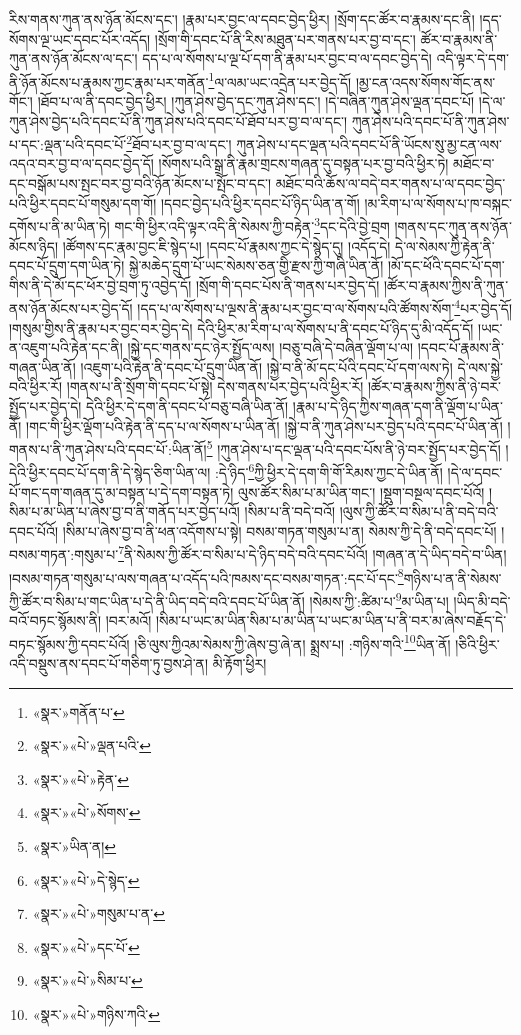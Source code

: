 རིས་གནས་ཀུན་ནས་ཉོན་མོངས་དང་། །རྣམ་པར་བྱང་ལ་དབང་བྱེད་ཕྱིར། །སྲོག་དང་ཚོར་བ་རྣམས་དང་ནི། །དད་སོགས་ལྔ་ཡང་དབང་པོར་འདོད། །སྲོག་གི་དབང་པོ་ནི་རིས་མཐུན་པར་གནས་པར་བྱ་བ་དང་། ཚོར་བ་རྣམས་ནི་ཀུན་ནས་ཉོན་མོངས་ལ་དང་། དད་པ་ལ་སོགས་པ་ལྔ་པོ་དག་ནི་རྣམ་པར་བྱང་བ་ལ་དབང་བྱེད་དེ། འདི་ལྟར་དེ་དག་ནི་ཉོན་མོངས་པ་རྣམས་ཀྱང་རྣམ་པར་གནོན་\footnote{«སྣར་»གནོན་པ་}ལ་ལམ་ཡང་འདྲེན་པར་བྱེད་དོ། །མྱ་ངན་འདས་སོགས་གོང་ནས་གོང་། །ཐོབ་པ་ལ་ནི་དབང་བྱེད་ཕྱིར། །ཀུན་ཤེས་བྱེད་དང་ཀུན་ཤེས་དང་། །དེ་བཞིན་ཀུན་ཤེས་ལྡན་དབང་པོ། །དེ་ལ་ཀུན་ཤེས་བྱེད་པའི་དབང་པོ་ནི་ཀུན་ཤེས་པའི་དབང་པོ་ཐོབ་པར་བྱ་བ་ལ་དང་། ཀུན་ཤེས་པའི་དབང་པོ་ནི་ཀུན་ཤེས་པ་དང་:ལྡན་པའི་དབང་པོ་\footnote{«སྣར་»«པེ་»ལྡན་པའི་}ཐོབ་པར་བྱ་བ་ལ་དང་། ཀུན་ཤེས་པ་དང་ལྡན་པའི་དབང་པོ་ནི་ཡོངས་སུ་མྱ་ངན་ལས་འདའ་བར་བྱ་བ་ལ་དབང་བྱེད་དོ། །སོགས་པའི་སྒྲ་ནི་རྣམ་གྲངས་གཞན་དུ་བསྟན་པར་བྱ་བའི་ཕྱིར་ཏེ། མཐོང་བ་དང་བསྒོམ་པས་སྤང་བར་བྱ་བའི་ཉོན་མོངས་པ་སྤོང་བ་དང་། མཐོང་བའི་ཆོས་ལ་བདེ་བར་གནས་པ་ལ་དབང་བྱེད་པའི་ཕྱིར་དབང་པོ་གསུམ་དག་གོ། །དབང་བྱེད་པའི་ཕྱིར་དབང་པོ་ཉིད་ཡིན་ན་གོ། །མ་རིག་པ་ལ་སོགས་པ་ཁ་བསྐང་དགོས་པ་ནི་མ་ཡིན་ཏེ། གང་གི་ཕྱིར་འདི་ལྟར་འདི་ནི་སེམས་ཀྱི་བརྟེན་\footnote{«སྣར་»«པེ་»རྟེན་}དང་དེའི་བྱེ་བྲག །གནས་དང་ཀུན་ནས་ཉོན་མོངས་ཉིད། །ཚོགས་དང་རྣམ་བྱང་ཇི་སྙེད་པ། །དབང་པོ་རྣམས་ཀྱང་དེ་སྙེད་དུ། །འདོད་དེ། དེ་ལ་སེམས་ཀྱི་རྟེན་ནི་དབང་པོ་དྲུག་དག་ཡིན་ཏེ། སྐྱེ་མཆེད་དྲུག་པོ་ཡང་སེམས་ཅན་གྱི་རྫས་ཀྱི་གཞི་ཡིན་ནོ། །མོ་དང་ཕོའི་དབང་པོ་དག་གིས་ནི་དེ་མོ་དང་ཕོར་བྱེ་བྲག་ཏུ་འབྱེད་དོ། །སྲོག་གི་དབང་པོས་ནི་གནས་པར་བྱེད་དོ། །ཚོར་བ་རྣམས་ཀྱིས་ནི་ཀུན་ནས་ཉོན་མོངས་པར་བྱེད་དོ། །དད་པ་ལ་སོགས་པ་ལྔས་ནི་རྣམ་པར་བྱང་བ་ལ་སོགས་པའི་ཚོགས་སོག་\footnote{«སྣར་»«པེ་»སོགས་}པར་བྱེད་དོ། །གསུམ་གྱིས་ནི་རྣམ་པར་བྱང་བར་བྱེད་དེ། དེའི་ཕྱིར་མ་རིག་པ་ལ་སོགས་པ་ནི་དབང་པོ་ཉིད་དུ་མི་འདོད་དོ། །ཡང་ན་འཇུག་པའི་རྟེན་དང་ནི། །སྐྱེ་དང་གནས་དང་ཉེར་སྤྱོད་ལས། །བཅུ་བཞི་དེ་བཞིན་ལྡོག་པ་ལ། །དབང་པོ་རྣམས་ནི་གཞན་ཡིན་ནོ། །འཇུག་པའི་རྟེན་ནི་དབང་པོ་དྲུག་ཡིན་ནོ། །སྐྱེ་བ་ནི་མོ་དང་པོའི་དབང་པོ་དག་ལས་ཏེ། དེ་ལས་སྐྱེ་བའི་ཕྱིར་རོ། །གནས་པ་ནི་སྲོག་གི་དབང་པོ་སྟེ། དེས་གནས་པར་བྱེད་པའི་ཕྱིར་རོ། །ཚོར་བ་རྣམས་ཀྱིས་ནི་ཉེ་བར་སྤྱོད་པར་བྱེད་དེ། དེའི་ཕྱིར་དེ་དག་ནི་དབང་པོ་བཅུ་བཞི་ཡིན་ནོ། །རྣམ་པ་དེ་ཉིད་ཀྱིས་གཞན་དག་ནི་ལྡོག་པ་ཡིན་ནོ། །གང་གི་ཕྱིར་ལྡོག་པའི་རྟེན་ནི་དད་པ་ལ་སོགས་པ་ཡིན་ནོ། །སྐྱེ་བ་ནི་ཀུན་ཤེས་པར་བྱེད་པའི་དབང་པོ་ཡིན་ནོ། །གནས་པ་ནི་ཀུན་ཤེས་པའི་དབང་པོ་:ཡིན་ནོ།\footnote{«སྣར་»ཡིན་ན།} །ཀུན་ཤེས་པ་དང་ལྡན་པའི་དབང་པོས་ནི་ཉེ་བར་སྤྱོད་པར་བྱེད་དོ། །དེའི་ཕྱིར་དབང་པོ་དག་ནི་དེ་སྙེད་ཅིག་ཡིན་ལ། :དེ་ཉིད་\footnote{«སྣར་»«པེ་»དེ་སྙེད་}ཀྱི་ཕྱིར་དེ་དག་གི་གོ་རིམས་ཀྱང་དེ་ཡིན་ནོ། །དེ་ལ་དབང་པོ་གང་དག་གཞན་དུ་མ་བསྟན་པ་དེ་དག་བསྟན་ཏེ། ལུས་ཚོར་སིམ་པ་མ་ཡིན་གང་། །སྡུག་བསྔལ་དབང་པོའོ། །སིམ་པ་མ་ཡིན་པ་ཞེས་བྱ་བ་ནི་གནོད་པར་བྱེད་པའོ། །སིམ་པ་ནི་བདེ་བའོ། །ལུས་ཀྱི་ཚོར་བ་སིམ་པ་ནི་བདེ་བའི་དབང་པོའོ། །སིམ་པ་ཞེས་བྱ་བ་ནི་ཕན་འདོགས་པ་སྟེ། བསམ་གཏན་གསུམ་པ་ན། སེམས་ཀྱི་དེ་ནི་བདེ་དབང་པོ། །བསམ་གཏན་:གསུམ་པ་\footnote{«སྣར་»«པེ་»གསུམ་པ་ན་}ནི་སེམས་ཀྱི་ཚོར་བ་སིམ་པ་དེ་ཉིད་བདེ་བའི་དབང་པོའོ། །གཞན་ན་དེ་ཡིད་བདེ་བ་ཡིན། །བསམ་གཏན་གསུམ་པ་ལས་གཞན་པ་འདོད་པའི་ཁམས་དང་བསམ་གཏན་:དང་པོ་དང་\footnote{«སྣར་»«པེ་»དང་པོ་}གཉིས་པ་ན་ནི་སེམས་ཀྱི་ཚོར་བ་སིམ་པ་གང་ཡིན་པ་དེ་ནི་ཡིད་བདེ་བའི་དབང་པོ་ཡིན་ནོ། །སེམས་ཀྱི་:ཚིམ་པ་\footnote{«སྣར་»«པེ་»སིམ་པ་}མ་ཡིན་པ། །ཡིད་མི་བདེ་བའོ་བཏང་སྙོམས་ནི། །བར་མའོ། །སིམ་པ་ཡང་མ་ཡིན་སིམ་པ་མ་ཡིན་པ་ཡང་མ་ཡིན་པ་ནི་བར་མ་ཞེས་བརྗོད་དེ་བཏང་སྙོམས་ཀྱི་དབང་པོའོ། །ཅི་ལུས་ཀྱིའམ་སེམས་ཀྱི་ཞེས་བྱ་ཞེ་ན། སྨྲས་པ། :གཉིས་གའི་\footnote{«སྣར་»«པེ་»གཉིས་ཀའི་}ཡིན་ནོ། །ཅིའི་ཕྱིར་འདི་བསྡུས་ནས་དབང་པོ་གཅིག་ཏུ་བྱས་ཤེ་ན། མི་རྟོག་ཕྱིར། 